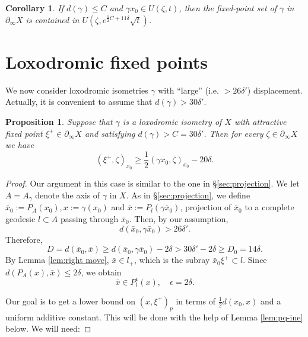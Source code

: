 \documentclass[12pt]{amsbook}%
\newtheorem{prop}[thm]{Proposition}
\newtheorem{cor}[thm]{Corollary}
\theoremstyle{definition}
\theoremstyle{remark}
\numberwithin{section}{chapter}
\numberwithin{subsection}{section}
\numberwithin{figure}{chapter}
\def\half{\frac{1}{2}}
\def\eps{\epsilon}
\def\ga{\gamma}
\def\geo{\partial_\infty}
\begin{document}
{{\begin{cor}
If $d(\ga)\leqslant C$ and $\ga x_0\in U(\zeta, t)$, then the fixed-point set of $\ga$ in $\geo X$ is contained in 
$U(\zeta, e^{\half C + 11\delta}\sqrt{t})$. 
\end{cor}

\section{Loxodromic fixed points}


We now consider loxodromic isometries $\ga$ with ``large'' (i.e. $> 26\delta'$) displacement. Actually, it is convenient to assume that $d(\ga)> 30\delta'$. 

\begin{prop}\label{prop:unbounded case} 
Suppose that $\ga$ is a loxodromic isometry of $X$ with attractive fixed point $\xi^+\in \geo X$ and satisfying $d(\ga)> C=30\delta'$. 
Then for every $\zeta\in \geo X$ we have  
$$
(\xi^+, \zeta)_{x_0} \geqslant \half (\ga x_0, \zeta)_{x_0} -20\delta. 
$$
\end{prop}
\begin{proof} Our argument in this case is similar to the one in \S \ref{sec:projection}. 
We let $A=A_\ga$  denote the axis of $\ga$ in $X$. As in \S \ref{sec:projection}, we define $\bar{x}_0:=P_A(x_0), x:=\ga(x_0)$ and 
$\bar{x}:=P_l(\ga \bar{x}_0)$, 
projection of $\bar{x}_0$ to a complete geodesic $l\subset A$ passing through $\bar{x}_0$. 
Then, by our assumption,
$$
d(\bar{x}_0, \ga \bar{x}_0)> 26\delta'. 
$$
Therefore,
$$
D= d(\bar{x}_0, \bar{x})\geqslant d(\bar{x}_0, \ga \bar{x}_0) - 2\delta > 30\delta'-2\delta \geqslant D_0=14\delta. 
$$
By Lemma \ref{lem:right move}, $\bar{x}\in l_+$, which is the subray $\bar{x}_0\xi^+\subset l$.  Since $d(P_A(x), \bar{x})\leqslant 2\delta$, we obtain
$$
\bar{x}\in P^\eps_l(x), \quad \eps=2\delta. 
$$

Our goal is to get a lower bound on $(x,\xi^+)_p$ in terms of $\half d(x_0, x)$ and a uniform additive constant. 
This will be done with the help of Lemma \ref{lem:pq-ine} below. We will need: 



\end{proof}}}
\end{document}
